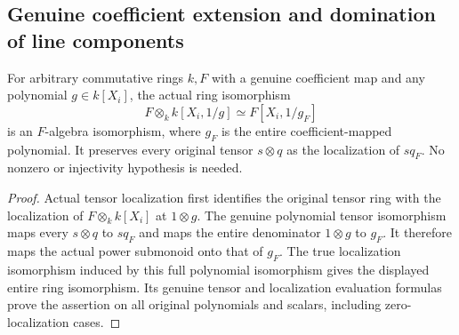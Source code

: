 \subsection{Genuine coefficient extension and domination of line components}
\label{subsec:scalar-extended-line-components}

\begin{theorem}
\label{algebra:principal-open-scalar-tensor}
\leanok
For arbitrary commutative rings $k,F$ with a genuine coefficient map and
any polynomial $g\in k[X_i]$, the actual ring isomorphism
\[
 F\otimes_k k[X_i,1/g]\simeq
 F[X_i,1/g_F]
\]
is an $F$-algebra isomorphism, where $g_F$ is the entire coefficient-mapped
polynomial. It preserves every original tensor $s\otimes q$ as the
localization of $s q_F$. No nonzero or injectivity hypothesis is needed.
\end{theorem}
\begin{proof}
Actual tensor localization first identifies the original tensor ring with
the localization of $F\otimes_k k[X_i]$ at $1\otimes g$. The genuine
polynomial tensor isomorphism maps every $s\otimes q$ to $s q_F$ and
maps the entire denominator $1\otimes g$ to $g_F$. It therefore maps
the actual power submonoid onto that of $g_F$. The true localization
isomorphism induced by this full polynomial isomorphism gives the
displayed entire ring isomorphism. Its genuine tensor and localization
evaluation formulas prove the assertion on all original polynomials
and scalars, including zero-localization cases.
\end{proof}

